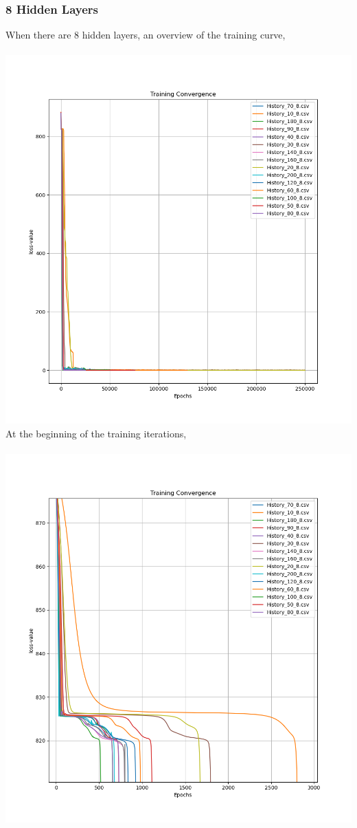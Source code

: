 \documentclass[a4paper, 12pt]{report}
\def\size{0.75}
\begin{document}
\begin{center}
\subsubsection{8 Hidden Layers}
When there are $8$ hidden layers, an overview of the training curve,
\\~\\\includegraphics[scale=\size]{Depth_8_Overview.png}
\newpage
At the beginning of the training iterations,
\\~\\\includegraphics[scale=\size]{Depth_8_Beginning.png}

\end{center}
\end{document}
